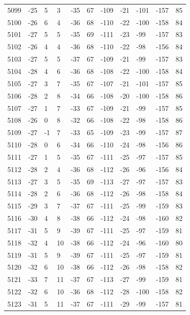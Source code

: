 \begin{table}[H]
\begin{tabular}{lllllllllll}
5099 & -25 & 5 & 3 & -35 & 67 & -109 & -21 & -101 & -157 & 85 \\
5100 & -26 & 6 & 4 & -36 & 68 & -110 & -22 & -100 & -158 & 84 \\
5101 & -27 & 5 & 5 & -35 & 69 & -111 & -23 & -99 & -157 & 83 \\
5102 & -26 & 4 & 4 & -36 & 68 & -110 & -22 & -98 & -156 & 84 \\
5103 & -27 & 5 & 5 & -37 & 67 & -109 & -21 & -99 & -157 & 83 \\
5104 & -28 & 4 & 6 & -36 & 68 & -108 & -22 & -100 & -158 & 84 \\
5105 & -27 & 3 & 7 & -35 & 67 & -107 & -21 & -101 & -157 & 85 \\
5106 & -28 & 2 & 8 & -34 & 66 & -108 & -20 & -100 & -158 & 86 \\
5107 & -27 & 1 & 7 & -33 & 67 & -109 & -21 & -99 & -157 & 85 \\
5108 & -26 & 0 & 8 & -32 & 66 & -108 & -22 & -98 & -158 & 86 \\
5109 & -27 & -1 & 7 & -33 & 65 & -109 & -23 & -99 & -157 & 87 \\
5110 & -28 & 0 & 6 & -34 & 66 & -110 & -24 & -98 & -156 & 86 \\
5111 & -27 & 1 & 5 & -35 & 67 & -111 & -25 & -97 & -157 & 85 \\
5112 & -28 & 2 & 4 & -36 & 68 & -112 & -26 & -96 & -156 & 84 \\
5113 & -27 & 3 & 5 & -35 & 69 & -113 & -27 & -97 & -157 & 83 \\
5114 & -28 & 2 & 6 & -36 & 68 & -112 & -26 & -98 & -158 & 84 \\
5115 & -29 & 3 & 7 & -37 & 67 & -111 & -25 & -99 & -159 & 83 \\
5116 & -30 & 4 & 8 & -38 & 66 & -112 & -24 & -98 & -160 & 82 \\
5117 & -31 & 5 & 9 & -39 & 67 & -111 & -25 & -97 & -159 & 81 \\
5118 & -32 & 4 & 10 & -38 & 66 & -112 & -24 & -96 & -160 & 80 \\
5119 & -31 & 5 & 9 & -39 & 67 & -111 & -25 & -97 & -159 & 81 \\
5120 & -32 & 6 & 10 & -38 & 66 & -112 & -26 & -98 & -158 & 82 \\
5121 & -33 & 7 & 11 & -37 & 67 & -113 & -27 & -99 & -159 & 81 \\
5122 & -32 & 6 & 10 & -36 & 68 & -112 & -28 & -100 & -158 & 82 \\
5123 & -31 & 5 & 11 & -37 & 67 & -111 & -29 & -99 & -157 & 81 \\

\end{tabular}
\end{table}
